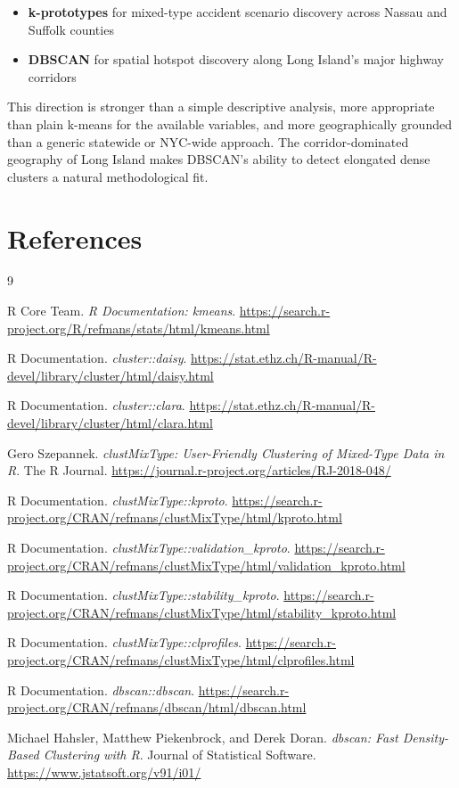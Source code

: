 \documentclass[11pt]{article}
\begin{document}
\begin{itemize}
\item \textbf{k-prototypes} for mixed-type accident scenario discovery across Nassau and Suffolk counties
\item \textbf{DBSCAN} for spatial hotspot discovery along Long Island's major highway corridors
\end{itemize}

This direction is stronger than a simple descriptive analysis, more appropriate than plain k-means for the available variables, and more geographically grounded than a generic statewide or NYC-wide approach. The corridor-dominated geography of Long Island makes DBSCAN's ability to detect elongated dense clusters a natural methodological fit.

\section{References}

\begin{thebibliography}{9}

R Core Team.
\textit{R Documentation: kmeans}.
\url{https://search.r-project.org/R/refmans/stats/html/kmeans.html}

R Documentation.
\textit{cluster::daisy}.
\url{https://stat.ethz.ch/R-manual/R-devel/library/cluster/html/daisy.html}

R Documentation.
\textit{cluster::clara}.
\url{https://stat.ethz.ch/R-manual/R-devel/library/cluster/html/clara.html}

Gero Szepannek.
\textit{clustMixType: User-Friendly Clustering of Mixed-Type Data in R}.
The R Journal.
\url{https://journal.r-project.org/articles/RJ-2018-048/}

R Documentation.
\textit{clustMixType::kproto}.
\url{https://search.r-project.org/CRAN/refmans/clustMixType/html/kproto.html}

R Documentation.
\textit{clustMixType::validation\_kproto}.
\url{https://search.r-project.org/CRAN/refmans/clustMixType/html/validation_kproto.html}

R Documentation.
\textit{clustMixType::stability\_kproto}.
\url{https://search.r-project.org/CRAN/refmans/clustMixType/html/stability_kproto.html}

R Documentation.
\textit{clustMixType::clprofiles}.
\url{https://search.r-project.org/CRAN/refmans/clustMixType/html/clprofiles.html}

R Documentation.
\textit{dbscan::dbscan}.
\url{https://search.r-project.org/CRAN/refmans/dbscan/html/dbscan.html}

Michael Hahsler, Matthew Piekenbrock, and Derek Doran.
\textit{dbscan: Fast Density-Based Clustering with R}.
Journal of Statistical Software.
\url{https://www.jstatsoft.org/v91/i01/}

\end{thebibliography}
\end{document}
